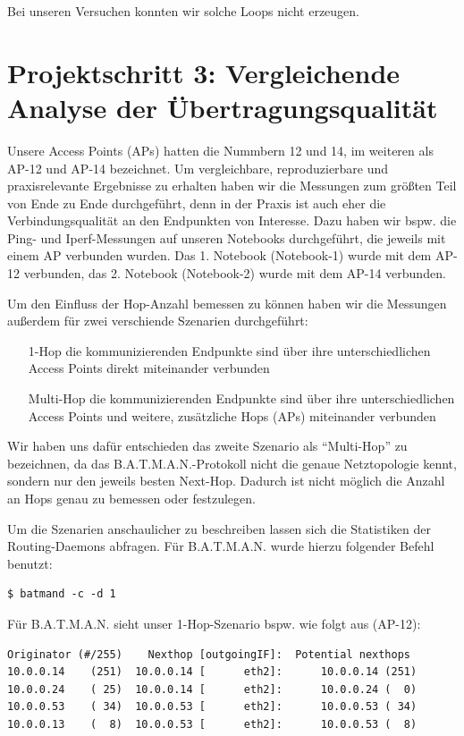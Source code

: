 \documentclass[a4paper,10pt]{article}
\begin{document}
Bei unseren Versuchen konnten wir solche Loops nicht erzeugen.

\section{Projektschritt 3: Vergleichende Analyse der Übertragungsqualität}

Unsere Access Points (APs) hatten die Nummbern 12 und 14, im weiteren als AP-12 und AP-14 bezeichnet.
Um vergleichbare, reproduzierbare und praxisrelevante Ergebnisse zu erhalten haben wir die Messungen zum größten Teil von Ende zu Ende durchgeführt, denn in der Praxis ist auch eher die Verbindungsqualität an den Endpunkten von Interesse.
Dazu haben wir bspw. die Ping- und Iperf-Messungen auf unseren Notebooks durchgeführt, die jeweils mit einem AP verbunden wurden.
Das 1. Notebook (Notebook-1) wurde mit dem AP-12 verbunden, das 2. Notebook (Notebook-2) wurde mit dem AP-14 verbunden.

Um den Einfluss der Hop-Anzahl bemessen zu können haben wir die Messungen außerdem für zwei verschiende Szenarien durchgeführt:
\begin{itemize}
  \item[1-Hop] die kommunizierenden Endpunkte sind über ihre unterschiedlichen Access Points direkt miteinander verbunden 
  \item[Multi-Hop] die kommunizierenden Endpunkte sind über ihre unterschiedlichen Access Points und weitere, zusätzliche Hops (APs) miteinander verbunden
\end{itemize}

Wir haben uns dafür entschieden das zweite Szenario als "`Multi-Hop"' zu bezeichnen, da das B.A.T.M.A.N.-Protokoll nicht die genaue Netztopologie kennt, sondern nur den jeweils besten Next-Hop.
Dadurch ist nicht möglich die Anzahl an Hops genau zu bemessen oder festzulegen.

Um die Szenarien anschaulicher zu beschreiben lassen sich die Statistiken der Routing-Daemons abfragen.
Für B.A.T.M.A.N. wurde hierzu folgender Befehl benutzt:

\begin{lstlisting}
$ batmand -c -d 1
\end{lstlisting}

Für B.A.T.M.A.N. sieht unser 1-Hop-Szenario bspw. wie folgt aus (AP-12):

\begin{lstlisting}
Originator (#/255)    Nexthop [outgoingIF]:  Potential nexthops
10.0.0.14    (251)  10.0.0.14 [      eth2]:      10.0.0.14 (251) 
10.0.0.24    ( 25)  10.0.0.14 [      eth2]:      10.0.0.24 (  0)
10.0.0.53    ( 34)  10.0.0.53 [      eth2]:      10.0.0.53 ( 34) 
10.0.0.13    (  8)  10.0.0.53 [      eth2]:      10.0.0.53 (  8)  
\end{lstlisting}
\end{document}
